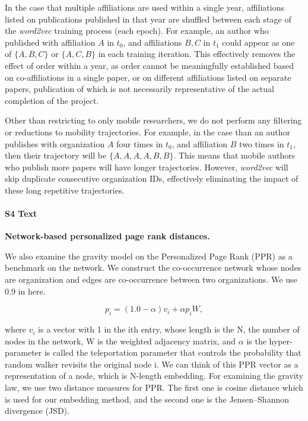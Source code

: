 \documentclass[12pt]{article} %
\begin{document}
In the case that multiple affiliations are used within a single year, affiliations listed on publications published in that year are shuffled between each stage of the \textit{word2vec} training process (each epoch). 
For example, an author who published with affiliation $A$ in $t_{0}$, and affiliations $B, C$ in $t_{1}$ could appear as one of $\{A, B, C\}$ or $\{A, C, B\}$ in each training iteration. 
This effectively removes the effect of order within a year, as order cannot be meaningfully established based on co-affiliations in a single paper, or on different affiliations listed on separate papers, publication of which is not necessarily representative of the actual completion of the project. 

Other than restricting to only mobile researchers, we do not perform any filtering or reductions to mobility trajectories.
For example, in the case than an author publishes with organization $A$ four times in $t_{0}$, and affiliation $B$ two times in $t_{1}$, then their trajectory will be $\{A, A, A, A, B, B\}$. 
This means that mobile authors who publish more papers will have longer trajectories.
However, \textit{word2vec} will skip duplicate consecutive organization IDs, effectively eliminating the impact of these long repetitive trajectories. 



%
\paragraph*{S4 Text}
\label{si:text:ppr_dist}
{\bf Network-based personalized page rank distances.}


We also examine the gravity model on the Personalized Page Rank (PPR)\autocite{jeh2003scaling} as a benchmark on the network. We construct the co-occurrence network whose nodes are organization and edges are co-occurrence between two organizations. We use 0.9 in here.

\begin{equation}
	\label{eq:ppr}
	p_i = (1.0 - \alpha) v_i + \alpha p_i W,
\end{equation}

where $v_i$ is a vector with 1 in the ith entry, whose length is the N, the number of nodes in the network, W is the weighted adjacency matrix, and $\alpha$ is the hyper-parameter is called the teleportation parameter that controls the probability that random walker revisits the original node i. We can think of this PPR vector as a representation of a node, which is N-length embedding. For examining the gravity law, we use two distance measures for PPR. The first one is cosine distance which is used for our embedding method, and the second one is the Jensen–Shannon divergence (JSD).
\end{document}
